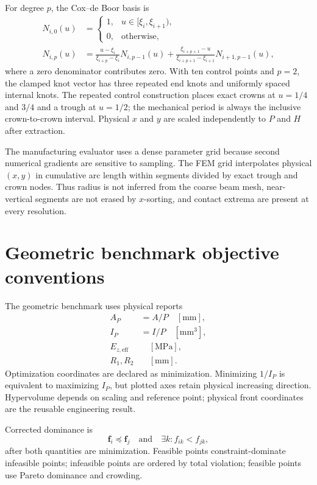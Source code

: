 \documentclass[11pt]{article}
\begin{document}
For degree $p$, the Cox--de Boor basis is
\begin{align}
N_{i,0}(u)&=\begin{cases}
1,&u\in[\xi_i,\xi_{i+1}),\\
0,&\text{otherwise},
\end{cases}\\
N_{i,p}(u)&=\frac{u-\xi_i}{\xi_{i+p}-\xi_i}N_{i,p-1}(u)
+\frac{\xi_{i+p+1}-u}{\xi_{i+p+1}-\xi_{i+1}}N_{i+1,p-1}(u),
\end{align}
where a zero denominator contributes zero. With ten control points and $p=2$, the clamped knot vector has three repeated end knots and uniformly spaced internal knots. The repeated control construction places exact crowns at $u=1/4$ and $3/4$ and a trough at $u=1/2$; the mechanical period is always the inclusive crown-to-crown interval. Physical $x$ and $y$ are scaled independently to $P$ and $H$ after extraction.

The manufacturing evaluator uses a dense parameter grid because second numerical gradients are sensitive to sampling. The FEM grid interpolates physical $(x,y)$ in cumulative arc length within segments divided by exact trough and crown nodes. Thus radius is not inferred from the coarse beam mesh, near-vertical segments are not erased by $x$-sorting, and contact extrema are present at every resolution.

\section{Geometric benchmark objective conventions}

The geometric benchmark uses physical reports
\begin{align}
A_P&=A/P\quad[\mathrm{mm}],\\
I_P&=I/P\quad[\mathrm{mm^3}],\\
E_{z,\mathrm{eff}}&\quad[\mathrm{MPa}],\\
R_1,R_2&\quad[\mathrm{mm}].
\end{align}
Optimization coordinates are declared as minimization. Minimizing $1/I_P$ is equivalent to maximizing $I_P$, but plotted axes retain physical increasing direction. Hypervolume depends on scaling and reference point; physical front coordinates are the reusable engineering result.

Corrected dominance is
\begin{equation}
\bm f_i\preceq\bm f_j
\quad\text{and}\quad
\exists k:f_{ik}<f_{jk},
\end{equation}
after both quantities are minimization. Feasible points constraint-dominate infeasible points; infeasible points are ordered by total violation; feasible points use Pareto dominance and crowding.
\end{document}
